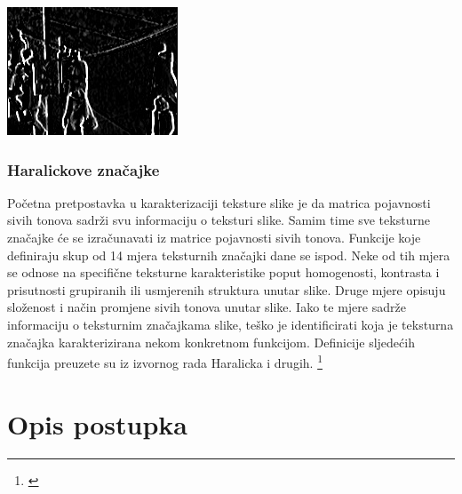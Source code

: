 \documentclass[times, utf8, zavrsni]{fer}
\begin{document}
\begin{multicols}{2}
\begin{minipage}{\linewidth}
\centering
\includegraphics[width=0.8\linewidth]{img/sobelx.jpg}
\end{minipage}

\end{multicols}

\newpage

\subsection{Haralickove značajke}

Početna pretpostavka u karakterizaciji teksture slike je da 
matrica pojavnosti sivih tonova sadrži svu  informaciju o teksturi slike. 
Samim time sve teksturne značajke će se izračunavati iz matrice pojavnosti sivih 
tonova. Funkcije koje definiraju skup od 14 mjera teksturnih značajki dane se ispod. 
Neke od tih mjera se odnose na specifične teksturne karakteristike poput homogenosti, 
kontrasta i prisutnosti grupiranih ili usmjerenih struktura unutar slike. Druge mjere 
opisuju složenost i način promjene sivih tonova unutar slike. Iako te mjere sadrže 
informaciju o teksturnim značajkama slike, teško je identificirati koja je teksturna 
značajka karakterizirana nekom konkretnom funkcijom. Definicije sljedećih funkcija preuzete su
iz izvornog rada Haralicka i drugih. \footnote{\cite{haralick}}






\chapter{Opis postupka}
\end{document}
